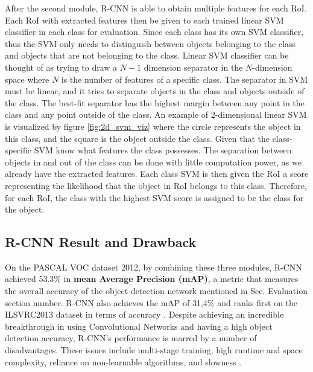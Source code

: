 After the second module, R-CNN is able to obtain multiple features for each RoI. Each RoI with extracted features then be given to each trained linear SVM classifier in each class for evaluation. Since each class has its own SVM classifier, thus the SVM only needs to distinguish between objects belonging to the class and objects that are not belonging to the class. Linear SVM classifier can be thought of as trying to draw a $N-1$ dimension separator in the $N$-dimension space where $N$ is the number of features of a specific class. The separator in SVM must be linear, and it tries to separate objects in the class and objects outside of the class. The best-fit separator has the highest margin between any point in the class and any point outside of the class. An example of 2-dimensional linear SVM is visualized by figure \ref{fig:2d_svm_viz} where the circle represents the object in this class, and the square is the object outside the class. Given that the class-specific SVM know what features the class possesses. The separation between objects in and out of the class can be done with little computation power, as we already have the extracted features. Each class SVM is then given the RoI a score representing the likelihood that the object in RoI belongs to this class. Therefore, for each RoI, the class with the highest SVM score is assigned to be the class for the object.

\subsection{R-CNN Result and Drawback}
On the PASCAL VOC dataset 2012, by combining these three modules, R-CNN achieved 53.3\% in \textbf{mean Average Precision (mAP)}, a metric that measures the overall accuracy of the object detection network mentioned in Sec. {\color{red} Evaluation section number}. R-CNN also achieves the mAP of 31,4\% and ranks first on the ILSVRC2013 dataset in terms of accuracy \cite{Girshick_R_CNN_2013}. Despite achieving an incredible breakthrough in using Convolutional Networks and having a high object detection accuracy, R-CNN's performance is marred by a number of disadvantages. These issues include multi-stage training, high runtime and space complexity, reliance on non-learnable algorithms, and slowness \cite{fast_rcnn_og}. 

